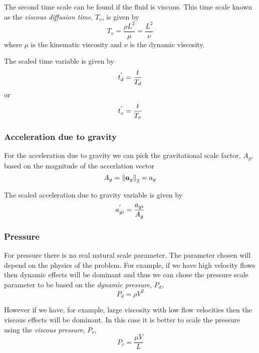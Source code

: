 The second time scale can be found if the fluid is viscous. This time
scale known as the \emph{viscous diffusion time}, $T_{v}$, is given by
\begin{equation}
  T_{v}=\dfrac{\rho L^{2}}{\mu}=\dfrac{L^{2}}{\nu}
\end{equation}
where $\mu$ is the kinematic viscosity and $\nu$ is the dynamic viscosity.

The scaled time variable is given by
\begin{equation}
   {t}^{'} _{d}=\dfrac{t}{T_{d}}
\end{equation}
or
\begin{equation}
   {t}^{'} _{v}=\dfrac{t}{T_{v}}
\end{equation}

\subsubsection{Acceleration due to gravity}
For the acceleration due to gravity we can pick the gravitational scale factor, $A_{g}$, based on the magnitude of the accerlation vector \ie
\begin{equation}
  A_{g}= {\left\|  \boldsymbol{a} _{g} \right\|_{2}} =a_{g}
\end{equation}

The scaled acceleration due to gravity variable is given by
\begin{equation}
   {a}^{'} _{gi}=\dfrac{a_{gi}}{A_{g}}
\end{equation}

\subsubsection{Pressure}
For pressure there is no real natural scale parameter. The parameter
chosen will depend on the physics of the problem. For example, if we
have high velocity flows then dynamic effects will be dominant and
thus we can chose the pressure scale parameter to be based on the
\emph{dynamic pressure}, $P_{d}$, \ie
\begin{equation}
  P_{d}=\rho V^{2}
\end{equation}

However if we have, for example, large viscosity with low flow
velocities then the viscous effects will be dominant. In this case it
is better to scale the pressure using the \emph{viscous pressure}, $P_{v}$, \ie
\begin{equation}
  P_{v}=\dfrac{\mu V}{L}
\end{equation}

